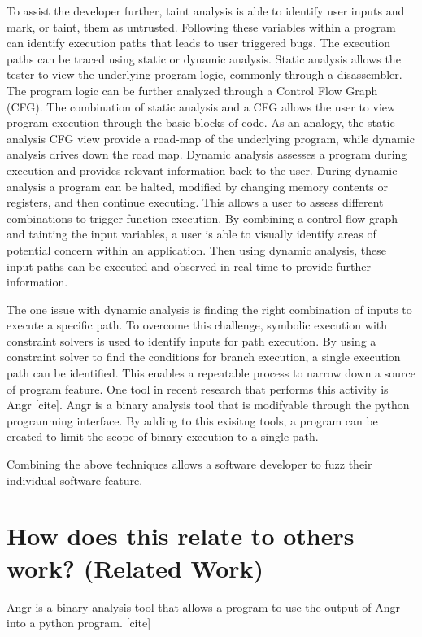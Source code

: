 \documentclass[conference]{IEEEtran}
\begin{document}
To assist the developer further, taint analysis is able to identify user inputs and mark, or taint, them as untrusted. Following these variables within a program can identify execution paths that leads to user triggered bugs. The execution paths can be traced using static or dynamic analysis. Static analysis allows the tester to view the underlying program logic, commonly through a disassembler. The program logic can be further analyzed through a Control Flow Graph (CFG). The combination of static analysis and a CFG allows the user to view program execution through the basic blocks of code. As an analogy, the static analysis CFG view provide a road-map of the underlying program, while dynamic analysis drives down the road map. Dynamic analysis assesses a program during execution and provides relevant information back to the user. During dynamic analysis a program can be halted, modified by changing memory contents or registers, and then continue executing. This allows a user to assess different combinations to trigger function execution. By combining a control flow graph and tainting the input variables, a user is able to visually identify areas of potential concern within an application. Then using dynamic analysis, these input paths can be executed and observed in real time to provide further information. 

The one issue with dynamic analysis is finding the right combination of inputs to execute a specific path. To overcome this challenge, symbolic execution with constraint solvers is used to identify inputs for path execution. By using a constraint solver to find the conditions for branch execution, a single execution path can be identified. This enables a repeatable process to narrow down a source of program feature. One tool in recent research that performs this activity is Angr [cite]. Angr is a binary analysis tool that is modifyable through the python programming interface. By adding to this exisitng tools, a program can be created to limit the scope of binary execution to a single path.

Combining the above techniques allows a software developer to fuzz their individual software feature. 

\section{How does this relate to others work? (Related Work)}
Angr is a binary analysis tool that allows a program to use the output of Angr into a python program. [cite]
\end{document}
